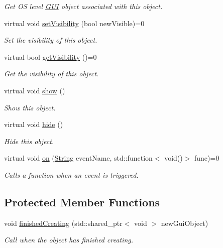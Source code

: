 \begin{DoxyCompactItemize}
\begin{DoxyCompactList}\small\item\em Get OS level \hyperlink{namespace_rad_j_a_v_1_1_g_u_i}{G\+UI} object associated with this object. \end{DoxyCompactList}\item 
virtual void \hyperlink{class_rad_j_a_v_1_1_g_u_i_1_1_g_object_a108ec023dce72af50ce3bbe5fb61b394}{set\+Visibility} (bool new\+Visible)=0
\begin{DoxyCompactList}\small\item\em Set the visibility of this object. \end{DoxyCompactList}\item 
virtual bool \hyperlink{class_rad_j_a_v_1_1_g_u_i_1_1_g_object_a9b30394c246dc1cce788c93e48e6e00d}{get\+Visibility} ()=0
\begin{DoxyCompactList}\small\item\em Get the visibility of this object. \end{DoxyCompactList}\item 
virtual void \hyperlink{class_rad_j_a_v_1_1_g_u_i_1_1_g_object_acaa57b7783df4cdc6a2e2bab0eb783a9}{show} ()
\begin{DoxyCompactList}\small\item\em Show this object. \end{DoxyCompactList}\item 
virtual void \hyperlink{class_rad_j_a_v_1_1_g_u_i_1_1_g_object_a7b05cad20d34e3eb5fc411dbb4834f9a}{hide} ()
\begin{DoxyCompactList}\small\item\em Hide this object. \end{DoxyCompactList}\item 
virtual void \hyperlink{class_rad_j_a_v_1_1_g_u_i_1_1_g_object_a224cec9275e8e5197d813ac5996f713c}{on} (\hyperlink{class_rad_j_a_v_1_1_string}{String} event\+Name, std\+::function$<$ void()$>$ func)=0
\begin{DoxyCompactList}\small\item\em Calls a function when an event is triggered. \end{DoxyCompactList}\end{DoxyCompactItemize}
\subsection*{Protected Member Functions}
\begin{DoxyCompactItemize}
\item 
void \hyperlink{class_rad_j_a_v_1_1_g_u_i_1_1_g_object_ad4d38f180cae50247bd585ba4cf5e7ac}{finished\+Creating} (std\+::shared\+\_\+ptr$<$ void $>$ new\+Gui\+Object)
\begin{DoxyCompactList}\small\item\em Call when the object has finished creating. \end{DoxyCompactList}\end{DoxyCompactItemize}
